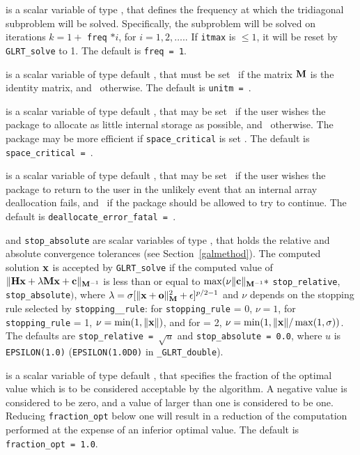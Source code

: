 \documentclass{galahad}
\newcommand{\packagename}{GL\-RT}
\newcommand{\fullpackagename}{\libraryname\_\packagename}
\begin{document}
\begin{description}
 is a scalar variable of type \integer, that
defines the frequency at which the tridiagonal subproblem will
be solved. Specifically, the subproblem will be solved on iterations
$k=1+$ {\tt freq} $\ast i$, for $i = 1, 2, \ldots.$.
If {\tt itmax} is $\leq 1$, it will be reset by
{\tt \packagename\_solve} to 1.
The default is {\tt freq = 1}.

 is a scalar variable of type default \logical, that
must be set \true\ if the matrix ${\mathbf{M}}$ is the identity matrix, and
\false\ otherwise.
The default is {\tt unitm = \true}.

 is a scalar variable of type default \logical, that
may be set \true\ if the user wishes the package to allocate as little
internal storage as possible, and \false\ otherwise. The package may
be more efficient if {\tt space\_critical} is set \false.
The default is {\tt space\_critical = \false}.

 is a scalar variable of type default \logical,
that may be set \true\ if the user wishes the package to return to the user
in the unlikely event that an internal array deallocation fails,
and \false\ if the package should be allowed to try to continue.
The default is {\tt deallocate\_error\_fatal = \false}.

 and {\tt stop\_absolute} are scalar variables of type
\realdp, that holds the
relative and absolute convergence tolerances (see Section~\ref{galmethod}).
The computed solution ${\mathbf{x}}$ is accepted by {\tt \packagename\_solve}
if the computed value of
$\|{\mathbf{H}} {\mathbf{x}} + \lambda {\mathbf{M}} {\mathbf{x}} + {\mathbf{c}}\|_{{{\mathbf{M}}^{-1}}} $ is less than or equal
to $\max (\nu \| {\mathbf{c}}\|_{{\mathbf{M}}^{-1}} \ast$ {\tt stop\_relative},
{\tt stop\_absolute}$)$, where $\lambda =
\sigma [ \|{\mathbf{x}}+{\mathbf{o}}\|_{{\mathbf{M}}}^2 + \epsilon]^{p/2-1}$ and $\nu$
depends on the stopping rule selected by %
{\tt stopping\_\_rule}:
for  {\tt stopping\_rule} = 0, $\nu = 1$,
for  {\tt stopping\_rule} = 1, $\nu = \min( 1, \|{\mathbf{x}}\|)$, and
for   = 2,
$\nu = \min( 1, \|{\mathbf{x}}\|/ \max(1,\sigma))$.
The defaults are {\tt stop\_relative = $\sqrt{u}$} and
{\tt stop\_absolute = 0.0},
where $u$ is {\tt EPSILON(1.0)} ({\tt EPSILON(1.0D0)} in
{\tt \fullpackagename\_double}).

 is a scalar variable of type default
\realdp, that specifies the fraction
of the optimal value which is to be considered acceptable by the algorithm.
A negative value is considered to be zero, and a value of larger than one
is considered to be one. Reducing {\tt fraction\_opt} below one will result
in a reduction of the computation performed at the expense of an inferior
optimal value.
The default is {\tt fraction\_opt = 1.0}.


\end{description}
\end{document}
